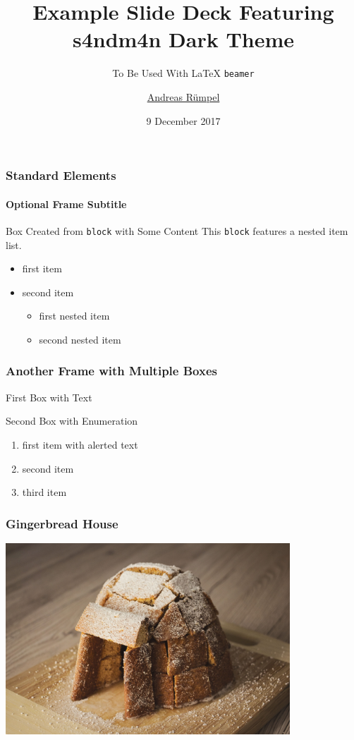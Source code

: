 \documentclass[aspectratio=1610,handout=false]{beamer}
\title{Example Slide Deck Featuring s4ndm4n Dark Theme}
\subtitle{To Be Used With \LaTeX{} \texttt{beamer}}
\author{\href{https://github.com/ruempel}{Andreas Rümpel}}
\institute{\href{https://github.com/ruempel/beamer-s4ndm4n}{https://github.com/ruempel/beamer-s4ndm4n}}
\date[2017-12-09]{9 December 2017}
\begin{document}
\maketitle

\begin{frame}
	\frametitle{Standard Elements}
	\framesubtitle{Optional Frame Subtitle}
	\begin{block}{Box Created from \texttt{block} with Some Content}
		This \texttt{block} features a nested item list.
		\begin{itemize}
			\item first item
			\item second item
			\begin{itemize}
				\item first nested item
				\item second nested item
			\end{itemize}
		\end{itemize}
	\end{block}
\end{frame}


\begin{frame}
	\frametitle{Another Frame with Multiple Boxes}
	\begin{block}{First Box with Text}
		\kant[9]
	\end{block}
	
	\begin{block}{Second Box with Enumeration}
		\begin{enumerate}
			\item first item with \alert{alerted text}
			\item second item
			\item third item
		\end{enumerate}
		\end{block}
\end{frame}


\begin{frame}
	\frametitle{Gingerbread House}
	\centering
	\includegraphics[width=0.8\textwidth]{gingerbread-house}
\end{frame}
\end{document}

